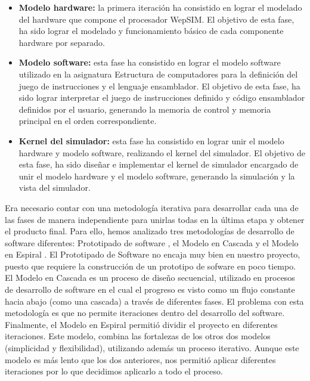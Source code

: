 \begin{itemize}
\item \textbf{Modelo hardware:} la primera iteración ha consistido en lograr el modelado del hardware que compone el procesador WepSIM. El objetivo de esta fase, ha sido lograr el modelado y funcionamiento básico de cada componente hardware por separado.

\item \textbf{Modelo software:} esta fase ha consistido en lograr el modelo software utilizado en la asignatura Estructura de computadores para la definición del juego de instrucciones y el lenguaje ensamblador. El objetivo de esta fase, ha sido lograr interpretar el juego de instrucciones definido y código ensamblador definidos por el usuario, generando la memoria de control y memoria principal en el orden correspondiente.

\item \textbf{Kernel del simulador:} esta fase ha consistido en lograr unir el modelo hardware y modelo software, realizando el kernel del simulador. El objetivo de esta fase, ha sido diseñar e implementar el kernel de simulador encargado de unir el modelo hardware y el modelo software, generando la simulación y la vista del simulador.
\end{itemize}

Era necesario contar con una metodología iterativa para desarrollar cada una de las fases de manera independiente para unirlas todas en la última etapa y obtener el producto final. Para ello, hemos analizado tres metodologías de desarrollo de software diferentes: Prototipado de software \cite{grimm1998}, el Modelo en Cascada \cite{hebert1983} y el Modelo en Espiral \cite{boehm1988}. El  Prototipado de Software no encaja muy bien en nuestro proyecto, puesto que requiere la construcción de un prototipo de sofware en poco tiempo. El Modelo en Cascada es un proceso de diseño secuencial, utilizado en procesos de desarrollo de software en el cual el progreso es visto como un flujo constante hacia abajo (como una cascada) a través de diferentes fases. El problema con esta metodología es que no permite iteraciones dentro del desarrollo del software. Finalmente, el Modelo en Espiral permitió dividir el proyecto en diferentes iteraciones. Este modelo, combina las fortalezas de los otros dos modelos (simplicidad y flexibilidad), utilizando además un proceso iterativo. Aunque este modelo es más lento que los dos anteriores, nos permitió aplicar diferentes iteraciones por lo que decidimos aplicarlo a todo el proceso.

